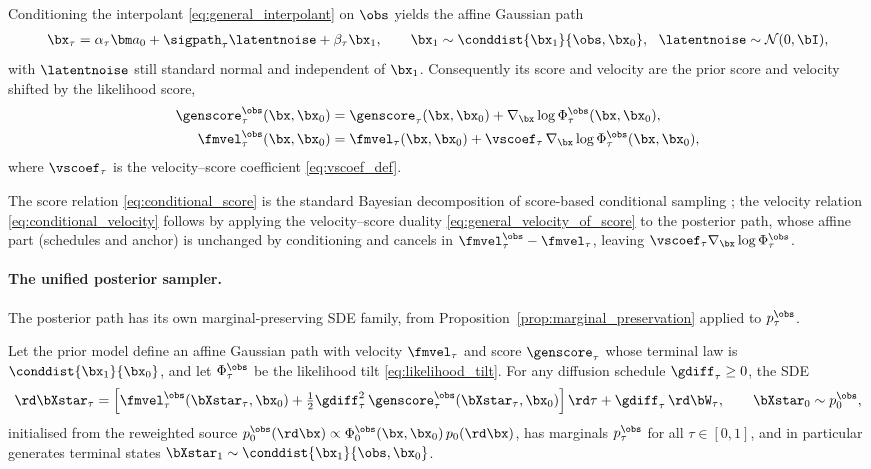 \begin{proposition}\label{prop:conditional_path}
Conditioning the interpolant \eqref{eq:general_interpolant} on $\obs$ yields the affine Gaussian path
\begin{align}
    \bx_\tau = \alpha_\tau\bm a_0 + \sigpath_\tau\latentnoise + \beta_\tau\bx_1,
    \qquad \bx_1\sim\conddist{\bx_1}{\obs,\bx_0},\ \ \latentnoise\sim\mathcal{N}(0,\bI),
\end{align}
with $\latentnoise$ still standard normal and independent of $\bx_1$. Consequently its score and velocity are the prior score and velocity shifted by the likelihood score,
\begin{align}
    \genscore_\tau^{\obs}(\bx,\bx_0)
    &= \genscore_\tau(\bx,\bx_0) + \nabla_{\bx}\log\Phi_\tau^{\obs}(\bx,\bx_0),
       \label{eq:conditional_score}\\
    \fmvel_\tau^{\obs}(\bx,\bx_0)
    &= \fmvel_\tau(\bx,\bx_0) + \vscoef_\tau\,\nabla_{\bx}\log\Phi_\tau^{\obs}(\bx,\bx_0),
       \label{eq:conditional_velocity}
\end{align}
where $\vscoef_\tau$ is the velocity--score coefficient \eqref{eq:vscoef_def}.
\end{proposition}

The score relation \eqref{eq:conditional_score} is the standard Bayesian decomposition of score-based conditional sampling \cite{song_score-based_2021}; the velocity relation \eqref{eq:conditional_velocity} follows by applying the velocity--score duality \eqref{eq:general_velocity_of_score} to the posterior path, whose affine part (schedules and anchor) is unchanged by conditioning and cancels in $\fmvel_\tau^{\obs}-\fmvel_\tau$, leaving $\vscoef_\tau\nabla_{\bx}\log\Phi_\tau^{\obs}$.

\paragraph{The unified posterior sampler.}
The posterior path has its own marginal-preserving SDE family, from Proposition~\ref{prop:marginal_preservation} applied to $p_\tau^{\obs}$.

\begin{theorem}\label{theorem:unified_posterior}
Let the prior model define an affine Gaussian path with velocity $\fmvel_\tau$ and score $\genscore_\tau$ whose terminal law is $\conddist{\bx_1}{\bx_0}$, and let $\Phi_\tau^{\obs}$ be the likelihood tilt \eqref{eq:likelihood_tilt}. For any diffusion schedule $\gdiff_\tau\ge0$, the SDE
\begin{align}\label{eq:unified_posterior_sde}
    \rd\bXstar_\tau
    = \left[\fmvel_\tau^{\obs}(\bXstar_\tau,\bx_0) + \tfrac12\gdiff_\tau^2\,\genscore_\tau^{\obs}(\bXstar_\tau,\bx_0)\right]\rd\tau
    + \gdiff_\tau\,\rd\bW_\tau,
    \qquad \bXstar_0\sim p_0^{\obs},
\end{align}
initialised from the reweighted source $p_0^{\obs}(\rd\bx)\propto\Phi_0^{\obs}(\bx,\bx_0)\,p_0(\rd\bx)$, has marginals $p_\tau^{\obs}$ for all $\tau\in[0,1]$, and in particular generates terminal states $\bXstar_1\sim\conddist{\bx_1}{\obs,\bx_0}$.
\end{theorem}

